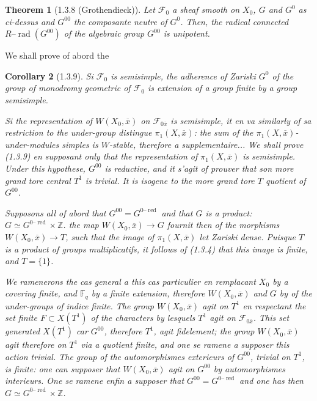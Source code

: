 \documentclass[12pt,a4paper]{article}
\theoremstyle{plain}
\newtheorem{theorem}{Theorem}[section]
\newtheorem{corollary}[theorem]{Corollary}
\theoremstyle{definition}
\theoremstyle{definition}
\theoremstyle{remark}
\DeclareMathOperator{\rad}{rad}
\DeclareMathOperator{\red}{red}
\begin{document}
\begin{theorem}[1.3.8 (Grothendieck)]
Let $\mathscr{F}_0$ a sheaf smooth on $X_0$, $G$ and $G^0$ as ci-dessus and $G^{00}$ the composante neutre of $G^0$. Then, the radical connected $R\text{--}\rad(G^{00})$ of the algebraic group $G^{00}$ is unipotent.
\end{theorem}

We shall prove of abord the

\begin{corollary}[1.3.9]
Si $\mathscr{F}_0$ is semisimple, the adherence of Zariski $G^0$ of the group of monodromy geometric of $\mathscr{F}_0$ is extension of a group finite by a group semisimple.

Si the representation of $W(X_0, \overline{x})$ on $\mathscr{F}_{0\overline{x}}$ is semisimple, it en va similarly of sa restriction to the under-group distingue $\pi_1(X, \overline{x})$: the sum of the $\pi_1(X, \overline{x})$-under-modules simples is $W$-stable, therefore a supplementaire... We shall prove (1.3.9) en supposant only that the representation of $\pi_1(X, \overline{x})$ is semisimple. Under this hypothese, $G^{00}$ is reductive, and it s'agit of prouver that son more grand tore central $T^1$ is trivial. It is isogene to the more grand tore $T$ quotient of $G^{00}$.

Supposons all of abord that $G^{00} = G^{0\text{--}\red}$ and that $G$ is a product: $G \simeq G^{0\text{--}\red} \times \mathbb{Z}$. the map $W(X_0, \overline{x}) \to G$ fournit then of the morphisms $W(X_0, \overline{x}) \to T$, such that the image of $\pi_1(X, \overline{x})$ let Zariski dense. Puisque $T$ is a product of groups multiplicatifs, it follows of (1.3.4) that this image is finite, and $T = \{1\}$.

We ramenerons the cas general a this cas particulier en remplacant $X_0$ by a covering finite, and $\mathbb{F}_q$ by a finite extension, therefore $W(X_0, \overline{x})$ and $G$ by of the under-groups of indice finite. The group $W(X_0, \overline{x})$ agit on $T^1$ en respectant the set finite $F \subset X(T^1)$ of the characters by lesquels $T^1$ agit on $\mathscr{F}_{0\overline{x}}$. This set generated $X(T^1)$ car $G^{00}$, therefore $T^1$, agit fidelement; the group $W(X_0, \overline{x})$ agit therefore on $T^1$ via a quotient finite, and one se ramene a supposer this action trivial. The group of the automorphismes exterieurs of $G^{00}$, trivial on $T^1$, is finite: one can supposer that $W(X_0, \overline{x})$ agit on $G^{00}$ by automorphismes interieurs. One se ramene enfin a supposer that $G^{00} = G^{0\text{--}\red}$ and one has then $G \simeq G^{0\text{--}\red} \times \mathbb{Z}$.
\end{corollary}
\end{document}
